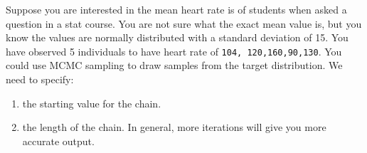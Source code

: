 \documentclass[
  12pt,
]{book}
\providecommand{\tightlist}{%
  \setlength{\itemsep}{0pt}\setlength{\parskip}{0pt}}
\begin{document}
Suppose you are interested in the mean heart rate is of students when asked a question in a stat course. You are not sure what the exact mean value is, but you know the values are normally distributed with a standard deviation of 15. You have observed 5 individuals to have heart rate of \texttt{104,\ 120,160,90,130}. You could use MCMC sampling to draw samples from the target distribution.
We need to specify:

\begin{enumerate}
\def\labelenumi{\arabic{enumi}.}
\tightlist
\item
  the starting value for the chain.
\item
  the length of the chain. In general, more iterations will give you more accurate output.
\end{enumerate}
\end{document}
